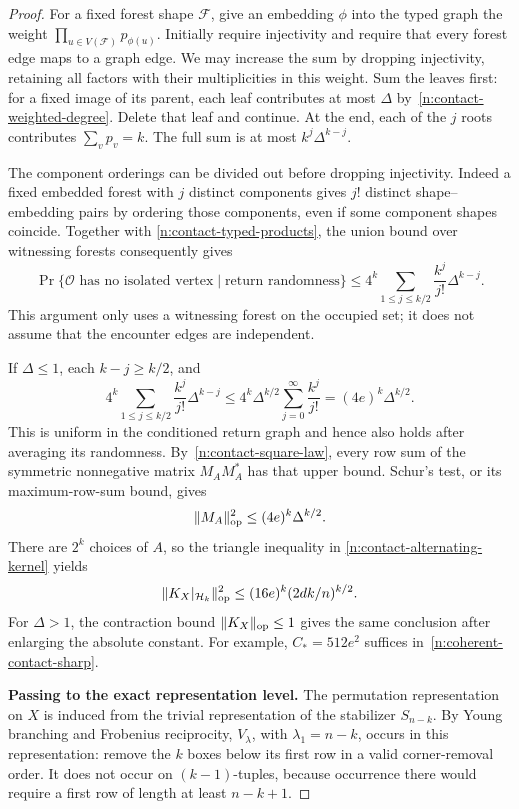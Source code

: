 \begin{proof}
For a fixed forest shape $\mathcal F$, give an embedding $\phi$ into the
typed graph the weight $\prod_{u\in V(\mathcal F)}p_{\phi(u)}$.
Initially require injectivity and require that every forest edge maps
to a graph edge.  We may increase the sum by dropping injectivity,
retaining all factors with their multiplicities in this weight.
Sum the leaves first: for a fixed image of its parent, each leaf
contributes at most $\Delta$ by~\eqref{n:contact-weighted-degree}.
Delete that leaf and continue.  At the end, each of the $j$ roots
contributes $\sum_vp_v=k$.  The full sum is at most
$k^j\Delta^{k-j}$.

The component orderings can be divided out before dropping injectivity.
Indeed a fixed embedded forest with $j$ distinct components gives
$j!$ distinct shape--embedding pairs by ordering those components,
even if some component shapes coincide.  Together with
\eqref{n:contact-typed-products}, the union bound over witnessing
forests consequently gives
\begin{equation}\label{n:contact-weighted-forest-count}
 \Pr\{\mathcal O\text{ has no isolated vertex}\mid\text{return randomness}\}
 \le4^k\sum_{1\le j\le k/2}\frac{k^j}{j!}\Delta^{k-j}.
\end{equation}
This argument only uses a witnessing forest on the occupied set;
it does not assume that the encounter edges are independent.

If $\Delta\le1$, each $k-j\ge k/2$, and
\[
 4^k\sum_{1\le j\le k/2}\frac{k^j}{j!}\Delta^{k-j}
 \le4^k\Delta^{k/2}\sum_{j=0}^{\infty}\frac{k^j}{j!}
 =(4e)^k\Delta^{k/2}.
\]
This is uniform in the conditioned return graph and hence also holds
after averaging its randomness.  By~\eqref{n:contact-square-law}, every
row sum of the symmetric nonnegative matrix $M_AM_A^*$ has that upper
bound.  Schur's test, or its maximum-row-sum bound, gives
\[
 \|M_A\|_{\mathrm{op}}^2\le(4e)^k\Delta^{k/2}.
\]
There are $2^k$ choices of $A$, so the triangle inequality in
\eqref{n:contact-alternating-kernel} yields
\begin{equation}\label{n:contact-harmonic-bound}
 \|K_X|_{\mathcal H_k}\|_{\mathrm{op}}^2
 \le(16e)^k(2dk/n)^{k/2}.
\end{equation}
For $\Delta>1$, the contraction bound $\|K_X\|_{\mathrm{op}}\le1$ gives the
same conclusion after enlarging the absolute constant.  For example,
$C_*=512e^2$ suffices in~\eqref{n:coherent-contact-sharp}.

\medskip\noindent\textbf{Passing to the exact representation level.}\enspace
The permutation representation on $X$ is induced from the trivial
representation of the stabilizer $S_{n-k}$.  By Young branching and
Frobenius reciprocity, $V_\lambda$, with $\lambda_1=n-k$, occurs in
this representation: remove the $k$ boxes below its first row in a
valid corner-removal order.  It does not occur on $(k-1)$-tuples,
because occurrence there would require a first row of length at
least $n-k+1$.


\end{proof}
